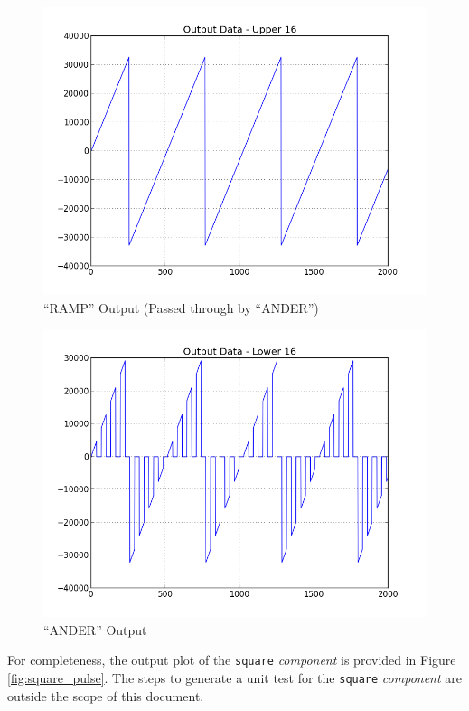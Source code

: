         \begin{figure}[h]
                \centering
                \includegraphics[scale=0.5]{./figures/upper16.jpg}
                \caption{``RAMP'' Output (Passed through by ``ANDER'')}
                \label{fig:upper16}
        \end{figure}

        \begin{figure}[h]
                \centering
                \includegraphics[scale=0.5]{./figures/lower16.jpg}
                \caption{``ANDER'' Output}
                \label{fig:lower16}
        \end{figure}

For completeness, the output plot of the \verb+square+ \textit{component} is provided in Figure \ref{fig:square_pulse}. The steps to generate a unit test for the \verb+square+ \textit{component} are outside the scope of this document.

